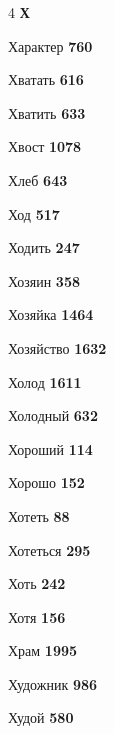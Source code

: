 \begin{multicols}{4}
\vspace{0.6em}\noindent\textbf{\normalsize\sffamily\color{primary} Х}\par\vspace{0.2em}
\noindent Характер \dotfill \textbf{\color{secondary} 760}\par
\noindent Хватать \dotfill \textbf{\color{secondary} 616}\par
\noindent Хватить \dotfill \textbf{\color{secondary} 633}\par
\noindent Хвост \dotfill \textbf{\color{secondary} 1078}\par
\noindent Хлеб \dotfill \textbf{\color{secondary} 643}\par
\noindent Ход \dotfill \textbf{\color{secondary} 517}\par
\noindent Ходить \dotfill \textbf{\color{secondary} 247}\par
\noindent Хозяин \dotfill \textbf{\color{secondary} 358}\par
\noindent Хозяйка \dotfill \textbf{\color{secondary} 1464}\par
\noindent Хозяйство \dotfill \textbf{\color{secondary} 1632}\par
\noindent Холод \dotfill \textbf{\color{secondary} 1611}\par
\noindent Холодный \dotfill \textbf{\color{secondary} 632}\par
\noindent Хороший \dotfill \textbf{\color{secondary} 114}\par
\noindent Хорошо \dotfill \textbf{\color{secondary} 152}\par
\noindent Хотеть \dotfill \textbf{\color{secondary} 88}\par
\noindent Хотеться \dotfill \textbf{\color{secondary} 295}\par
\noindent Хоть \dotfill \textbf{\color{secondary} 242}\par
\noindent Хотя \dotfill \textbf{\color{secondary} 156}\par
\noindent Храм \dotfill \textbf{\color{secondary} 1995}\par
\noindent Художник \dotfill \textbf{\color{secondary} 986}\par
\noindent Худой \dotfill \textbf{\color{secondary} 580}\par


\end{multicols}
